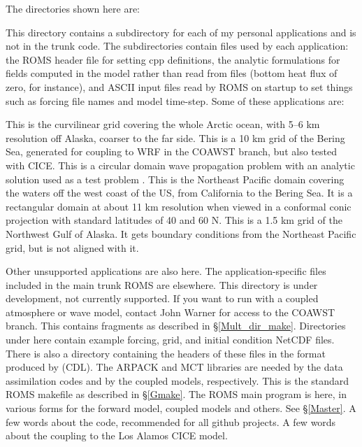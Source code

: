 The directories shown here are:
\begin{klist}
   This directory contains a subdirectory for each of my
  personal applications and is not in the trunk code. The subdirectories
  contain files used by each application: the ROMS header file for
  setting cpp definitions, the analytic formulations for fields
  computed in the model rather than read from files (bottom heat
  flux of zero, for instance), and ASCII input files read by ROMS
  on startup to set things such as forcing file names and model
  time-step. Some of these applications are:
\begin{klist}
   This is the curvilinear grid covering the whole Arctic
    ocean, with 5--6 km resolution off Alaska, coarser to the far side.
   This is a 10 km grid of the Bering Sea, generated for
    coupling to WRF in the COAWST branch, but also tested with CICE.
   This is a circular domain wave propagation problem
    with an analytic solution used as a test problem \citep{Lamb32}.
   This is the Northeast Pacific domain covering the
    waters off the west coast of the US, from California to the Bering
    Sea. It is a rectangular domain at about 11 km resolution when
    viewed in a conformal conic projection with standard latitudes of
    40 and 60 N.
   This is a 1.5 km grid of the Northwest Gulf of Alaska. It
    gets boundary conditions from the Northeast Pacific grid, but is not
    aligned with it.
\end{klist}
  Other unsupported applications are also here. The application-specific
  files included in the main trunk ROMS are elsewhere.
   This directory is under development, not
    currently supported. If you want to run with a coupled atmosphere or
    wave model, contact John Warner for access to the COAWST branch.
   This contains  fragments as described in
    \S\ref{Mult_dir_make}.
   Directories under here contain example forcing, grid,
    and initial condition NetCDF files. There is also a directory
    containing the headers of these files in the format produced by
     (CDL).
   The ARPACK and MCT libraries are needed by the data
    assimilation codes and by the coupled models, respectively.
   This is the standard ROMS makefile as described
    in \S\ref{Gmake}.
   The ROMS main program is here, in various forms for
    the forward model, coupled models and others. See \S\ref{Master}.
   A few words about the code, recommended for all github
    projects.
   A few words about the coupling to the Los Alamos
    CICE model.


\end{klist}

